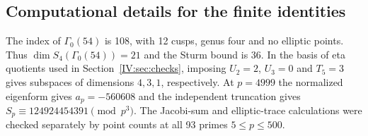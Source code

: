 \documentclass[11pt,letterpaper]{article}
\newcommand{\runningpaper}{Hypergeometric supercongruences}
\theoremstyle{definition}
\theoremstyle{remark}
\begin{document}
\subsection{Computational details for the finite identities}
The index of $\Gamma_0(54)$ is 108, with 12 cusps, genus four and
no elliptic points. Thus $\dim S_4(\Gamma_0(54))=21$ and the Sturm
bound is 36. In the basis of eta quotients used in Section~\ref{IV:sec:checks},
imposing $U_2=2$, $U_3=0$ and $T_5=3$ gives subspaces of dimensions
$4,3,1$, respectively. At $p=4999$ the normalized eigenform gives
$a_p=-560608$ and the independent truncation gives
$S_p\equiv124924454391\pmod{p^3}$.
The Jacobi-sum and elliptic-trace calculations were checked separately
by point counts at all 93 primes $5\le p\le500$.


\endgroup
\renewcommand{\runningpaper}{References}
\end{document}
